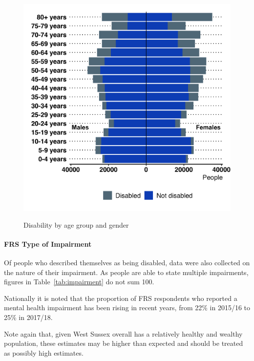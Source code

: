 \begin{figure}[htp]
    \caption{Disability by age group and gender}
    \centering
	\includegraphics[width=\linewidth]{images/frs_disability_wsx.png}
	\label{fig:frs_diab_wsx}
\end{figure}


\paragraph{FRS Type of Impairment} Of people who described themselves as being disabled, data were also collected on the nature of their impairment. As people are able to state multiple impairments, figures in Table~\ref{tab:impairment} do not sum 100.

Nationally it is noted that the proportion of FRS respondents who reported a mental health impairment has been rising in recent years, from 22\% in 2015/16 to 25\% in 2017/18.%

Note again that, given West Sussex overall has a relatively healthy and wealthy population, these estimates may be higher than expected and should be treated as possibly high estimates.

